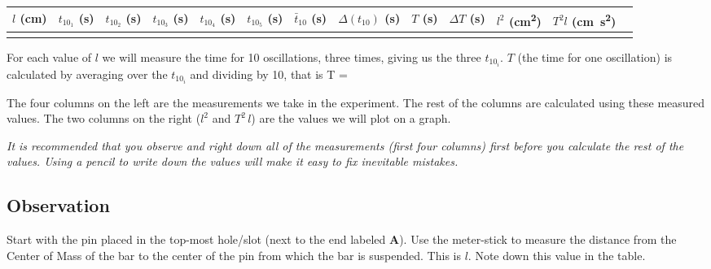 \documentclass{article}
\begin{document}
         \begin{table}[h]
            \centering

            \begin{tabular}{| c | c | c | c | c | c || c | c | c | c || c | c | c |}

               \hline
               $l$ (\si{\centi\metre}) & $t_{10_1}$ (\si{\second}) & $t_{10_2}$ (\si{\second}) & $t_{10_3}$ (\si{\second}) & $t_{10_4}$ (\si{\second}) & $t_{10_5}$ (\si{\second}) & $\bar{t}_{10}$ (\si{\second}) & $\Delta(t_{10})$ (\si{\second}) & $T$ (\si{\second}) & $\Delta T$ (\si{\second}) & $l^2$ (\si{\square\centi\metre}) & $T^2 l$ (\si{\centi\metre \square\second}) \\

               \hline
                  & & & & & & & & & & & \\
               \hline

            \end{tabular}
         \end{table}
         For each value of $l$ we will measure the time for 10 oscillations, three times, giving us the three $t_{10_i}$. $T$ (the time for one oscillation) is calculated by averaging over the $t_{10_i}$ and dividing by 10, that is
         \beq \label{calc_T}
            T = 
         \eeq

         The four columns on the left are the measurements we take in the experiment. The rest of the columns are calculated using these measured values. The two columns on the right ($l^2$ and $T^2 \, l$) are the values we will plot on a graph.

         \textit{It is recommended that you observe and right down all of the measurements (first four columns) first before you calculate the rest of the values. Using a pencil to write down the values will make it easy to fix inevitable mistakes.}

      \subsection*{Observation}

      Start with the pin placed in the top-most hole/slot (next to the end labeled \textbf{A}). Use the meter-stick to measure the distance from the Center of Mass of the bar to the center of the pin from which the bar is suspended. This is $l$. Note down this value in the table.
\end{document}
